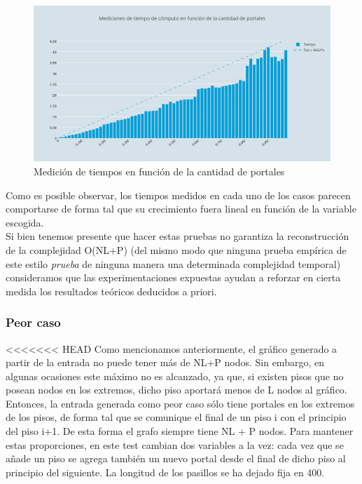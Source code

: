 \begin{figure}[h!]
   \begin{center}
 	\includegraphics[width=18cm]{imagenes/ej2/f(portales).png}
	\caption{Medición de tiempos en función de la cantidad de portales}
	\label{portales}
   \end{center}
 \end{figure}


Como es posible observar, los tiempos medidos en cada uno de los casos parecen comportarse de forma tal que su crecimiento fuera lineal en función de la variable escogida.\\

Si bien tenemos presente que hacer estas pruebas no garantiza la reconstrucción de la complejidad O(NL+P) (del mismo modo que ninguna prueba empírica de este estilo \textit{prueba} de ninguna manera una determinada complejidad temporal) consideramos que las experimentaciones expuestas ayudan a reforzar en cierta medida los resultados teóricos deducidos a priori. \\

\subsubsection{Peor caso}
<<<<<<< HEAD
Como mencionamos anteriormente, el gráfico generado a partir de la entrada no puede tener más de NL+P nodos. Sin embargo, en algunas ocasiones este máximo no es alcanzado, ya que, si existen pisos que no posean nodos en los extremos, dicho piso aportará menos de L nodos al gráfico. Entonces, la entrada generada como peor caso sólo tiene portales en los extremos de los pisos, de forma tal que se comunique el final de un piso i con el principio del piso i+1. De esta forma el grafo siempre tiene NL + P nodos. Para mantener estas proporciones, en este test cambian dos variables a la vez: cada vez que se añade un piso se agrega también un nuevo portal desde el final de dicho piso al principio del siguiente. La longitud de los pasillos se ha dejado fija en 400.


